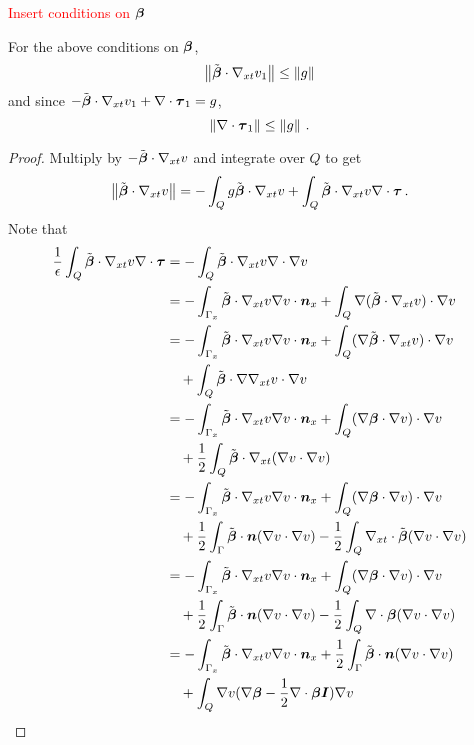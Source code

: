 \documentclass{article}
\begin{document}
\textcolor{red}{Insert conditions on $\boldsymbol\beta$}
\begin{lemma}
For the above conditions on $\boldsymbol\beta$,
\[
\left\| \tilde{\boldsymbol\beta}\cdot\nabla_{xt} v_1 \right\|\leq \left\| g \right\|
\]
and since $-\tilde{\boldsymbol\beta}\cdot\nabla_{xt} v_1+\nabla\cdot\boldsymbol\tau_1=g$,
\[
\left\| \nabla\cdot\boldsymbol\tau_1 \right\|\leq\left\| g \right\|\,.
\]
\end{lemma}
\begin{proof}
Multiply by $-\tilde{\boldsymbol\beta}\cdot\nabla_{xt} v$ and integrate over $Q$ to get
\begin{equation}
\label{eq:adj1}
\left\| \tilde{\boldsymbol\beta}\cdot\nabla_{xt} v \right\|=-\int_Q g\tilde{\boldsymbol\beta}\cdot\nabla_{xt} v+\int_Q\tilde{\boldsymbol\beta}\cdot\nabla_{xt} v\nabla\cdot\boldsymbol\tau\,.
\end{equation}
Note that
\begin{align*}
\frac{1}{\epsilon}\int_Q\tilde\bfbeta\cdot\Gradxt v\Div\bftau&=-\int_Q\tilde\bfbeta\cdot\Gradxt v\Div\Grad v \\
%
&=-\int_{\Gamma_x}\tilde\bfbeta\cdot\Gradxt v\Grad v\cdot\bfn_x
+\int_Q\Grad(\tilde\bfbeta\cdot\Gradxt v)\cdot\Grad v \\
%
&=-\int_{\Gamma_x}\tilde\bfbeta\cdot\Gradxt v\Grad v\cdot\bfn_x
+\int_Q(\Grad\tilde\bfbeta\cdot\Gradxt v)\cdot\Grad v\\
&\quad+\int_Q\tilde\bfbeta\cdot\Grad\Gradxt v\cdot\Grad v\\
%
&=-\int_{\Gamma_x}\tilde\bfbeta\cdot\Gradxt v\Grad v\cdot\bfn_x
+\int_Q(\Grad\bfbeta\cdot\Grad v)\cdot\Grad v\\
&\quad+\frac{1}{2}\int_Q\tilde\bfbeta\cdot\Gradxt(\Grad v\cdot\Grad v)\\
%
&=-\int_{\Gamma_x}\tilde\bfbeta\cdot\Gradxt v\Grad v\cdot\bfn_x
+\int_Q(\Grad\bfbeta\cdot\Grad v)\cdot\Grad v\\
&\quad+\frac{1}{2}\int_\Gamma\tilde\bfbeta\cdot\bfn(\Grad v\cdot\Grad v)
-\frac{1}{2}\int_Q\Divxt\tilde\bfbeta(\Grad v\cdot\Grad v)\\
%
&=-\int_{\Gamma_x}\tilde\bfbeta\cdot\Gradxt v\Grad v\cdot\bfn_x
+\int_Q(\Grad\bfbeta\cdot\Grad v)\cdot\Grad v\\
&\quad+\frac{1}{2}\int_\Gamma\tilde\bfbeta\cdot\bfn(\Grad v\cdot\Grad v)
-\frac{1}{2}\int_Q\Div\bfbeta(\Grad v\cdot\Grad v)\\
%
&=-\int_{\Gamma_x}\tilde\bfbeta\cdot\Gradxt v\Grad v\cdot\bfn_x
+\frac{1}{2}\int_\Gamma\tilde\bfbeta\cdot\bfn(\Grad v\cdot\Grad v)\\
&\quad+\int_Q\Grad v(\Grad\bfbeta-\frac{1}{2}\Div\bfbeta\bfI)\Grad v\\
\end{align*}

\end{proof}
\end{document}
